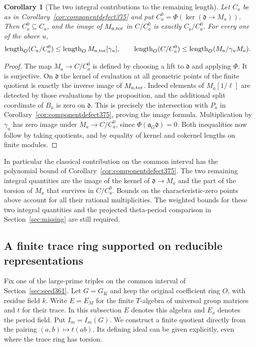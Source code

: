 \documentclass[a4paper,11pt]{article}
\newtheorem{corollary}[proposition]{Corollary}
\theoremstyle{definition}
\theoremstyle{remark}
\newcommand{\len}{\operatorname{length}}\newcommand{\Res}{\operatorname*{Res}}
\numberwithin{equation}{section}
\begin{document}
\begin{corollary}[The two integral contributions to the remaining length]
\label{cor:twointegral377}
Let \(C_a\) be as in Corollary~\ref{cor:componentdefect375}
and put \(C_a^0=\Phi(\ker(\mathfrak d\to M_a))\).
Then \(C_a^0\subseteq C_a\), and the image of
\(M_{a,\rm tor}\) in \(C/C_a^0\) is exactly \(C_a/C_a^0\).
For every one of the above \(u\),
\[
 \len_O(C_a/C_a^0)\le \len_O M_{a,\rm tor}[\gamma_u],
 \qquad
 \len_O(C/C_a^0)\le\len_O(M_a/\gamma_u M_a).
\]
\end{corollary}
\begin{proof}
The map \(M_a\to C/C_a^0\) is defined by choosing a lift
to \(\mathfrak d\) and applying \(\Phi\). It is surjective.
On \(\mathfrak d\) the kernel of evaluation at all geometric
points of the finite quotient is exactly the inverse image
of \(M_{a,\rm tor}\). Indeed elements of \(M_a[1/\ell]\)
are detected by those evaluations by the proposition, and
the additional split coordinate of \(B_a\) is zero on
\(\mathfrak d\). This is precisely the intersection with
\(P_a\) in Corollary~\ref{cor:componentdefect375}, proving
the image formula. Multiplication by \(\gamma_u\) has zero
image under \(M_a\to C/C_a^0\), since
\(\Phi(\mathfrak a_G\mathfrak d)=0\). Both inequalities
now follow by taking quotients, and by equality of kernel
and cokernel lengths on finite modules.
\end{proof}

In particular the classical contribution on the common
interval has the polynomial bound of
Corollary~\ref{cor:componentdefect375}. The two remaining
integral quantities are the image of the kernel of
\(\mathfrak d\to M_a\) and the part of the torsion of \(M_a\)
that survives in \(C/C_a^0\). Bounds on the characteristic-zero
points above account for all their rational multiplicities.
The weighted bounds for these two integral quantities and
the projected theta-period comparison in
Section~\ref{sec:missing} are still required.


\subsection{A finite trace ring supported on reducible representations}
\label{sec:reducibleminors378}

Fix one of the large-prime triples on the common interval of
Section~\ref{sec:seed361}. Let \(G=G_K\) and keep the original
coefficient ring \(O\), with residue field \(k\). Write \(E=E_M\)
for the finite \(T\)-algebra of universal group matrices and
\(t\) for their trace. In this subsection \(E\) denotes this
algebra and \(E_x\) denotes the period field. Put \(I_m=I_m(G)\).
We construct a finite quotient directly from the pairing
\((a,b)\mapsto t(ab)\). Its defining ideal can be given
explicitly, even where the trace ring has torsion.
\end{document}

